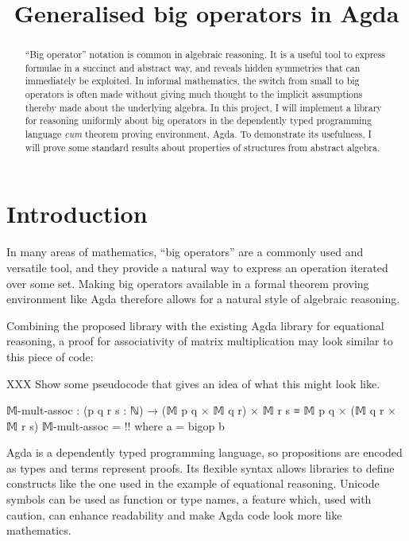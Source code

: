 \documentclass[a4paper]{scrartcl}
\title{\phantomsection%
  Generalised big operators in Agda%
  \label{generalised-big-operators-in-agda}}
\author{}
\date{}
\begin{document}
\maketitle


\begin{abstract}
\enquote{Big operator} notation is common in algebraic reasoning. It is a useful tool to express formulae in a succinct and abstract way, and reveals hidden symmetries that can immediately be exploited. In informal mathematics, the switch from small to big operators is often made without giving much thought to the implicit assumptions thereby made about the underlying algebra. In this project, I will implement a library for reasoning uniformly about big operators in the dependently typed programming language \emph{cum} theorem proving environment, Agda. To demonstrate its usefulness, I will prove some standard results about properties of structures from abstract algebra.
\end{abstract}

\section{Introduction%
  \label{introduction}%
}

In many areas of mathematics, \enquote{big operators} are a commonly used and versatile tool, and they provide a natural way to express an operation iterated over some set. Making big operators available in a formal theorem proving environment like Agda therefore allows for a natural style of algebraic reasoning.

Combining the proposed library with the existing Agda library for equational reasoning, a proof for associativity of matrix multiplication may look similar to this piece of code:

XXX Show some pseudocode that gives an idea of what this might look like.

\begin{code}
𝕄-mult-assoc : (p q r s : ℕ) →
               (𝕄 p q × 𝕄 q r) × 𝕄 r s ≡ 𝕄 p q × (𝕄 q r × 𝕄 r s)
𝕄-mult-assoc = {!!}
    where a = bigop b
\end{code}

Agda is a dependently typed programming language, so propositions are encoded as types and terms represent proofs. Its flexible syntax allows libraries to define constructs like the one used in the example of equational reasoning. Unicode symbols can be used as function or type names, a feature which, used with caution, can enhance readability and make Agda code look more like mathematics.
\end{document}
